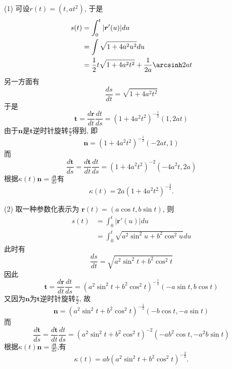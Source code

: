 \begin{tcolorbox}
	[breakable, colback = Emerald!10, colframe = cyan!40!green, title = 解2.1]
	(1)
	可设$r(t)=(t,at^2)$,
	于是
	\begin{equation*}
		\begin{split}
			s(t)
			&= \int_{0}^{t}|\boldsymbol{r}'(u)|du \\
			&= \int \sqrt{1+4a^2u^2}du \\
			&= \frac{1}{2}t\sqrt{1+4a^{2}t^2} + \frac{1}{2a}\arcsinh 2at
		\end{split}
	\end{equation*}
	另一方面有
	\begin{equation*}
		\frac{ds}{dt} = \sqrt{1+4a^2t^2}
	\end{equation*}
	于是
	\begin{equation*}
		\boldsymbol{t}=\frac{d\boldsymbol{r}}{dt}\frac{dt}{ds}
		=(1+4a^2t^2)^{-\frac{1}{2}}(1,2at)
	\end{equation*}
	由于$\boldsymbol{n}$是$\boldsymbol{t}$逆时针旋转$\frac{\pi}{2}$得到,
	即
	\begin{equation*}
		\boldsymbol{n}=(1+4a^2t^2)^{-\frac{1}{2}}(-2at,1)
	\end{equation*}
	而
	\begin{equation*}
		\frac{d\boldsymbol{t}}{ds}=\frac{d\boldsymbol{t}}{dt}\frac{dt}{ds}
			=(1+4a^2t^2)^{-2}(-4a^2t,2a)
	\end{equation*}
	根据$\kappa(t)\boldsymbol{n}=\frac{d\boldsymbol{t}}{ds}$有
	\begin{equation*}
		\kappa(t)=2a(1+4a^2t^2)^{-\frac{3}{2}}.
	\end{equation*}

(2)
取一种参数化表示为
$\boldsymbol{r}(t)=(a\cos t,b \sin t)$,
则
\begin{equation*}
	\begin{split}
		s(t)
		&= \int_{0}^{t}|\boldsymbol{r}'(u)|du \\
		&= \int_{0}^{t}\sqrt{a^2\sin^2u+b^2\cos^2u}du
	\end{split}
\end{equation*}
此时有
\begin{equation*}
	\frac{ds}{dt}=\sqrt{a^2\sin^2t+b^2\cos^2t}
\end{equation*}
因此
\begin{equation*}
	\boldsymbol{t}=\frac{d\boldsymbol{r}}{dt}\frac{dt}{ds}
	=(a^2\sin^2t+b^2\cos^2t)^{-\frac{1}{2}}(-a\sin t, b\cos t)
\end{equation*}
又因为$\boldsymbol{n}$为$\boldsymbol{t}$逆时针旋转$\frac{\pi}{2}$,
故
\begin{equation*}
	\boldsymbol{n}=(a^2\sin^2t+b^2\cos^2t)^{-\frac{1}{2}}(-b\cos t, -a\sin t)
\end{equation*}
而
\begin{equation*}
	\frac{d\boldsymbol{t}}{ds}=\frac{d\boldsymbol{t}}{dt}\frac{dt}{ds}
	=(a^2\sin^2t+b^2\cos^2t)^{-2}(-ab^2\cos t, -a^2b\sin t)
\end{equation*}
根据$\kappa(t)\boldsymbol{n}=\frac{d\boldsymbol{t}}{ds}$,有
\begin{equation*}
	\kappa(t)=ab(a^2\sin^2t+b^2\cos^2t)^{-\frac{3}{2}}.
\end{equation*}


\end{tcolorbox}
